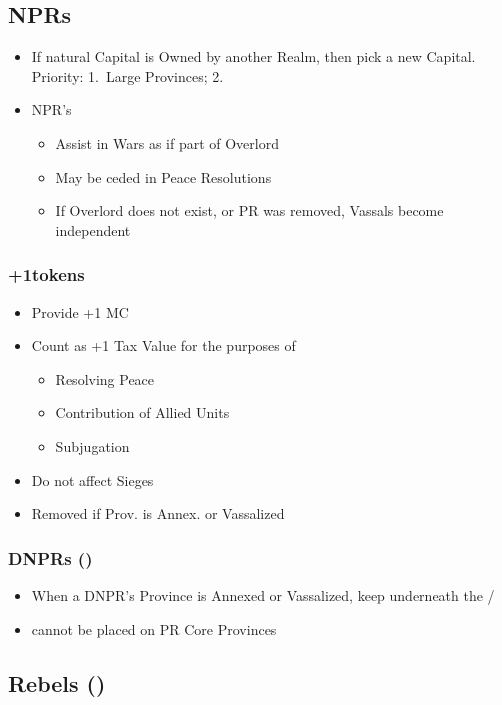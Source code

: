 \documentclass[10pt]{article}
\begin{document}
\subsection*{NPRs }
\begin{itemize}
	\item If natural Capital is Owned by another Realm, then pick a new Capital. Priority: 1.~Large Provinces; 2.~\az
	\item NPR's 
	\begin{itemize}
		\item Assist in Wars as if part of Overlord
		\item May be ceded in Peace Resolutions
		\item If Overlord does not exist, or PR \vassal was removed, Vassals become independent
	\end{itemize}
\end{itemize}

\subsubsection*{+1\manpower tokens }
\begin{itemize}
	\item Provide +1 MC
	\item Count as +1 Tax Value for the purposes of 
	\begin{itemize}
		\item Resolving Peace
		\item Contribution of Allied Units
		\item Subjugation
	\end{itemize}
	\item Do not affect Sieges
	\item Removed if Prov. is Annex. or Vassalized
\end{itemize}

\subsubsection*{DNPRs (\dnpr) }
\begin{itemize}
	\item When a DNPR's Province is Annexed or Vassalized, keep \dnpr underneath the \town/\vassal 
	\item \dnpr cannot be placed on PR Core Provinces
\end{itemize}

\subsection*{Rebels (\rebel) }
\end{document}
